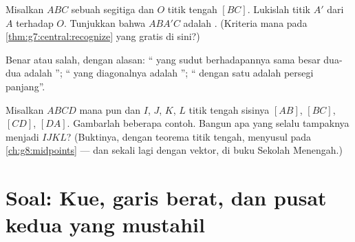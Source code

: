 \begin{exercise}[$\star\star$]\label{exo:g7:central:9}
Misalkan $ABC$ sebuah segitiga dan $O$ titik tengah $[BC]$. Lukislah
titik  $A'$ dari $A$ terhadap $O$. Tunjukkan bahwa $ABA'C$
adalah . (Kriteria mana pada
\cref{thm:g7:central:recognize} yang gratis di sini?)
\end{exercise}

\begin{exercise}[$\star\star$]\label{exo:g7:central:10}
Benar atau salah, dengan alasan: `` yang sudut
berhadapannya sama besar dua-dua adalah ''; ``
yang diagonalnya  adalah ''; ``
dengan satu  adalah persegi panjang''.
\end{exercise}

\begin{exercise}[$\star\star\star$]\label{exo:g7:central:11}
Misalkan $ABCD$  mana pun dan $I$, $J$, $K$, $L$ titik
tengah sisinya $[AB]$, $[BC]$, $[CD]$, $[DA]$. Gambarlah beberapa
contoh. Bangun apa yang selalu tampaknya menjadi $IJKL$? (Buktinya,
dengan teorema titik tengah, menyusul pada \cref{ch:g8:midpoints} ---
dan sekali lagi dengan vektor, di buku Sekolah Menengah.)
\end{exercise}

\section{Soal: Kue, garis berat, dan pusat kedua yang
mustahil}

